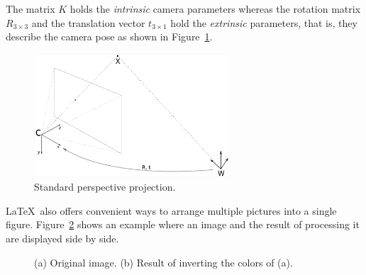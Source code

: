 \documentclass[a4paper, twoside, english]{article}
\begin{document}
The matrix $K$ holds the \emph{intrinsic} camera parameters whereas the rotation matrix $R_{3 \times 3}$ and the translation vector $t_{3 \times 1}$ hold the \emph{extrinsic} parameters, that is, 
they describe the camera pose as shown in Figure~\ref{fig:stdProj}.
\begin{figure}[ht]
 \centerline{\includegraphics[width=0.65\textwidth]{stdProjection.png}}
 \caption[Standard perspective projection]{Standard perspective projection.}
 \label{fig:stdProj}
\end{figure}

\LaTeX\ also offers convenient ways to arrange multiple pictures into a single figure.
Figure~\ref{fig:inversion} shows an example where an image and the result of processing it are displayed side by side.
\begin{figure}[ht]
 \centerline
 {
  \qquad
 }
 \caption[Color inversion]{(a) Original image. (b) Result of inverting the colors of (a).}
 \label{fig:inversion}
\end{figure}
\end{document}
